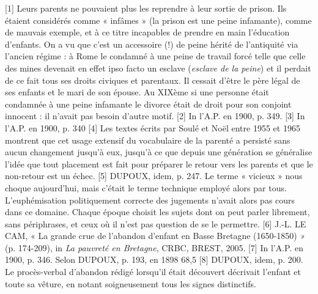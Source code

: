 [1] Leurs parents ne pouvaient plus les reprendre à leur sortie de prison. Ils étaient considérés comme « infâmes » (la prison est une peine infamante), comme de mauvais exemple, et à ce titre incapables de prendre en main l'éducation d'enfants. On a vu que c'est un accessoire (!) de peine hérité de l'antiquité via l'ancien régime : à Rome le condamné à une peine de travail forcé telle que celle des mines devenait en effet ipso facto un esclave (\emph{esclave de la peine}) et il perdait de ce fait tous ses droits civiques et parentaux. Il cessait d'être le père légal de ses enfants et le mari de son épouse. Au XIXème si une personne était condamnée à une peine infamante le divorce était de droit pour son conjoint innocent : il n'avait pas besoin d'autre motif.
[2] In l'A.P. en 1900, p. 349.
[3] In l'A.P. en 1900, p. 340
[4] Les textes écrits par Soulé et Noël entre 1955 et 1965 montrent que cet usage extensif du vocabulaire de la parenté a persisté sans aucun changement jusqu'à eux, jusqu'à ce que depuis une génération se généralise l'idée que tout placement est fait pour préparer le retour vers les parents et que le non-retour est un échec.
[5] DUPOUX, idem, p. 247. Le terme « vicieux » nous choque aujourd'hui, mais c'était le terme technique employé alors par tous. L'euphémisation politiquement correcte des jugements n'avait alors pas cours dans ce domaine. Chaque époque choisit les sujets dont on peut parler librement, sans périphrases, et ceux où il n'est pas question de se le permettre.
[6] J.-L. LE CAM, « La grande crue de l'abandon d'enfant en Basse Bretagne (1650-1850) \emph{ »} (p. 174-209), in \emph{La pauvreté en Bretagne}, CRBC, BREST, 2005.
[7] In l'A.P. en 1900, p. 346. Selon DUPOUX, p. 193, en 1898 68,5 %
[8] DUPOUX, idem, p. 200. Le procès-verbal d'abandon rédigé lorsqu'il était découvert décrivait l'enfant et toute sa vêture, en notant soigneusement tous les signes distinctifs.
